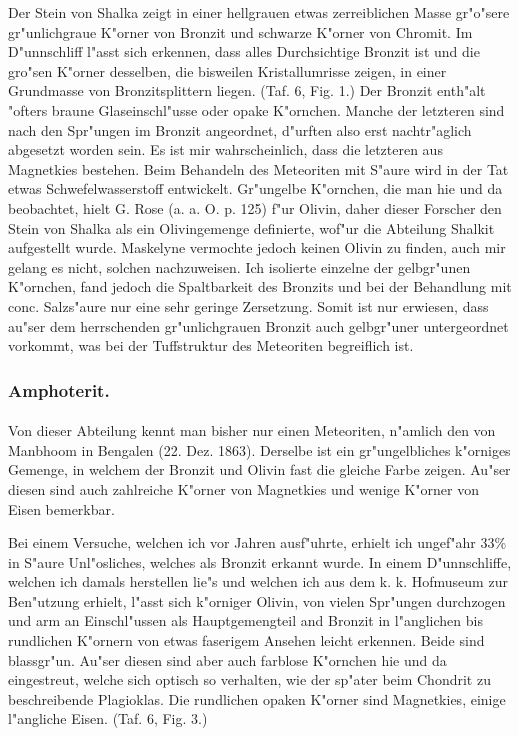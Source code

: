 \documentclass[a4paper, 11pt, oneside, polutonikogreek, german]{article}
\begin{document}
Der Stein von Shalka zeigt in einer hellgrauen etwas zerreiblichen Masse gr"o"sere gr"unlichgraue K"orner von Bronzit und schwarze K"orner von Chromit. Im D"unnschliff l"asst sich erkennen, dass alles Durchsichtige Bronzit ist und die gro"sen K"orner desselben, die bisweilen Kristallumrisse zeigen, in einer Grundmasse von Bronzitsplittern liegen. (Taf. 6, Fig. 1.) Der Bronzit enth"alt "ofters braune Glaseinschl"usse oder opake K"ornchen. Manche der letzteren sind nach den Spr"ungen im Bronzit angeordnet, d"urften also erst nachtr"aglich abgesetzt worden sein. Es ist mir wahrscheinlich, dass die letzteren aus Magnetkies bestehen. Beim Behandeln des Meteoriten mit S"aure wird in der Tat etwas Schwefelwasserstoff entwickelt. Gr"ungelbe K"ornchen, die man hie und da beobachtet, hielt G. Rose (a. a. O. p. 125) f"ur Olivin, daher dieser Forscher den Stein von Shalka als ein Olivingemenge definierte, wof"ur die Abteilung Shalkit aufgestellt wurde. Maskelyne vermochte jedoch keinen Olivin zu finden, auch mir gelang es nicht, solchen nachzuweisen. Ich isolierte einzelne der gelbgr"unen K"ornchen, fand jedoch die Spaltbarkeit des Bronzits und bei der Behandlung mit conc. Salzs"aure nur eine sehr geringe Zersetzung. Somit ist nur erwiesen, dass au"ser dem herrschenden gr"unlichgrauen Bronzit auch gelbgr"uner untergeordnet vorkommt, was bei der Tuffstruktur des Meteoriten begreiflich ist.

\subsubsection{Amphoterit.}
\paragraph{}
Von dieser Abteilung kennt man bisher nur einen Meteoriten, n"amlich den von Manbhoom in Bengalen (22. Dez. 1863). Derselbe ist ein gr"ungelbliches k"orniges Gemenge, in welchem der Bronzit und Olivin fast die gleiche Farbe zeigen. Au"ser diesen sind auch zahlreiche K"orner von Magnetkies und wenige K"orner von Eisen bemerkbar.

Bei einem Versuche, welchen ich vor Jahren ausf"uhrte, erhielt ich ungef"ahr 33\% in S"aure Unl"osliches, welches als Bronzit erkannt wurde. In einem D"unnschliffe, welchen ich damals herstellen lie"s und welchen ich aus dem k. k. Hofmuseum zur Ben"utzung erhielt, l"asst sich k"orniger Olivin, von vielen Spr"ungen durchzogen und arm an Einschl"ussen als Hauptgemengteil and Bronzit in l"anglichen bis rundlichen K"ornern von etwas faserigem Ansehen leicht erkennen. Beide sind blassgr"un. Au"ser diesen sind aber auch farblose K"ornchen hie und da eingestreut, welche sich optisch so verhalten, wie der sp"ater beim Chondrit zu beschreibende Plagioklas. Die rundlichen opaken K"orner sind Magnetkies, einige l"angliche Eisen. (Taf. 6, Fig. 3.)
\end{document}

